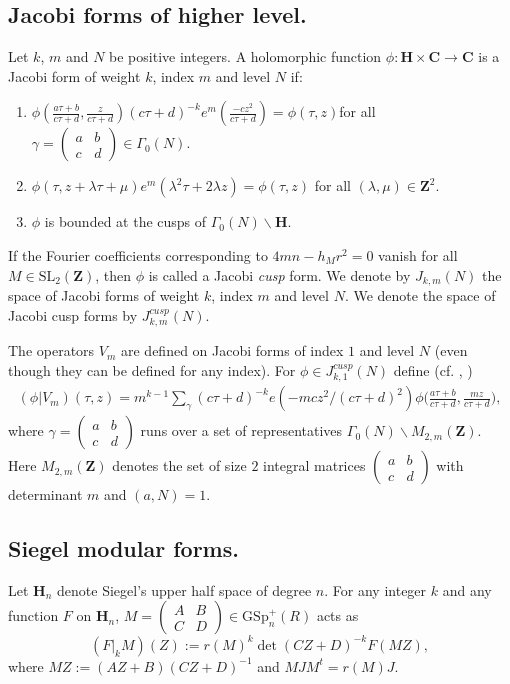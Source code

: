 \documentclass[11pt]{amsart}
\numberwithin{equation}{section}
\theoremstyle{plain}
\theoremstyle{definition}
\newcommand{\z}{\mf Z}
\newcommand{\mf}{\mathbf}
\newcommand{\mrm}{\mathrm}
\newcommand{\q}{\quad}
\newcommand{\sumn}{\sum \nolimits}
\newcommand{\smat}[4]{\left( \begin{smallmatrix}#1&#2\\#3&#4\end{smallmatrix}\right)}
\newcommand{\jkn}{J^{cusp}_{k,1}(N)}
\begin{document}
\subsection{Jacobi forms of higher level.}\label{Jacobiprelim}
Let $k$, $m$ and $N$ be positive integers. A holomorphic function $\phi:\mf H\times \mf C\rightarrow \mf C$ is a Jacobi form of weight $k$, index $m$ and level $N$ if:
\begin{enumerate}

\item $\phi\left(\frac{a \tau+b}{c \tau+d}, \frac{z}{c \tau+d}\right)(c \tau + d)^{-k} e^m\left(\frac{-c z^{2}}{c \tau+d}\right)=\phi(\tau,z)$\qquad for all $\gamma=\smat{a}{b}{c}{d}\in \Gamma_0(N)$.

\item $\phi(\tau, z+\lambda\tau+\mu)e^m(\lambda^2\tau+2\lambda z)=\phi(\tau,z)$ \q\;\qquad for all $(\lambda,\mu)\in \mf Z^2$.

\item $\phi$ is bounded at the cusps of $\Gamma_0(N)\backslash \mf H$.
\end{enumerate}
If the Fourier coefficients corresponding to $4mn-h_Mr^2=0$ vanish for all $M\in \mrm{SL}_2(\mf Z)$, then $\phi$ is called a Jacobi \textit{cusp} form. We denote by $J_{k,m}(N)$ the space of Jacobi forms of weight $k$, index $m$ and level $N$. We denote the space of Jacobi cusp forms by $J_{k,m}^{cusp}(N)$. 

The operators $V_m$ are defined on Jacobi forms of index $1$ and level $N$ (even though they can be defined for any index). For $\phi \in \jkn$ define (cf. \cite[\S~4 (2)]{EZ}, \cite[Section 3]{Ibu-SK})
\begin{align} \label{vmdef}
    (\phi|V_m)(\tau,z)= m^{k-1} \sumn_{\gamma } (c \tau+d)^{-k} e(-m c z^2/(c \tau+d)^2) \phi \big(\frac{a \tau +b}{c \tau+d}, \frac{m z}{c \tau+d} \big),
\end{align}
where $\gamma =\smat{a}{b}{c}{d} $ runs over a set of representatives $\Gamma_0(N) \backslash M_{2,m}(\z)$. Here $M_{2,m}(\z)$ denotes the set of size $2$ integral matrices $\smat{a}{b}{c}{d}$ with determinant $m$ and $(a,N)=1$.

\subsection{Siegel modular forms.}
Let $\mf H_n$ denote Siegel's upper half space of degree $n$. For any integer $k$ and any function $F$ on $\mf H_n$, $M=\smat{A}{B}{C}{D}\in \mrm {GSp}^+_n(R) $ acts as 
\begin{equation}
    (F|_k M) (Z) := r(M)^k \det(CZ+D)^{-k} F(MZ),
\end{equation}
where $MZ:= (AZ+B)(CZ+D)^{-1}$ and $MJM^t=r(M) J$.
\end{document}
